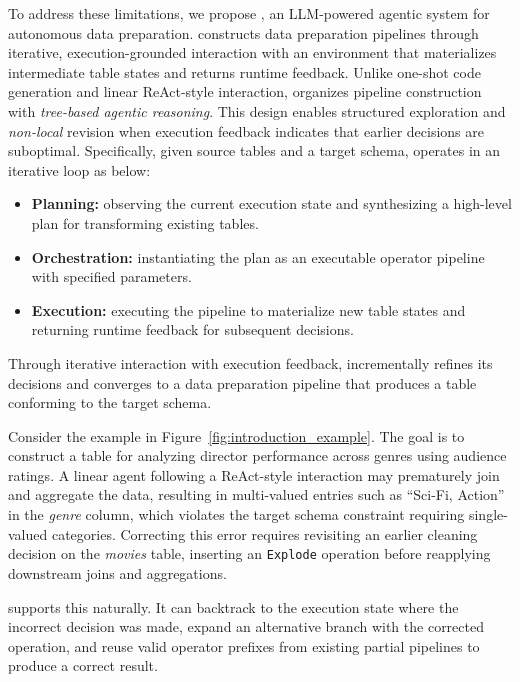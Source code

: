 To address these limitations, we propose \textbf{\sys}, an LLM-powered agentic system for autonomous data preparation. \sys constructs data preparation pipelines through iterative, execution-grounded interaction with an environment that materializes intermediate table states and returns runtime feedback. 
Unlike one-shot code generation and linear ReAct-style interaction,
\sys organizes pipeline construction with \emph{tree-based agentic reasoning}.
This design enables structured exploration and \emph{non-local} revision when execution feedback indicates that earlier decisions are suboptimal.
Specifically, given source tables and a target schema, \sys operates in an iterative loop as below:
\begin{itemize}[leftmargin=*]
\item \textbf{Planning:} observing the current execution state and synthesizing a high-level plan for transforming existing tables.
\item \textbf{Orchestration:} instantiating the plan as an executable operator pipeline with specified parameters.
\item \textbf{Execution:} executing the pipeline to materialize new table states and returning runtime feedback for subsequent decisions.
\end{itemize}
%
Through iterative interaction with execution feedback, \sys incrementally refines its decisions and converges to a data preparation pipeline that produces a table conforming to the target schema.
%
\begin{example}
\label{exam:intro_tree_advantage}
Consider the example in Figure~\ref{fig:introduction_example}. The goal is to construct a table for analyzing director performance across genres using audience ratings. A linear agent following a ReAct-style interaction may prematurely join and aggregate the data, resulting in multi-valued entries such as ``Sci-Fi, Action'' in the \textit{genre} column, which violates the target schema constraint requiring single-valued categories. Correcting this error requires revisiting an earlier cleaning decision on the \textit{movies} table, \ie inserting an \texttt{Explode} operation before reapplying downstream joins and aggregations.

\sys supports this naturally. 
It can backtrack to the execution state where the incorrect decision was made, expand an alternative branch with the corrected operation, and reuse valid operator prefixes from existing partial pipelines to produce a correct result.
\end{example}

